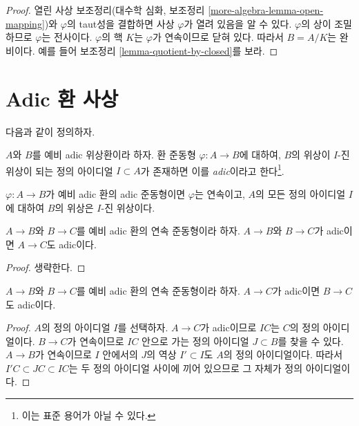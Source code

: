 \begin{proof}
열린 사상 보조정리(대수학 심화, 보조정리
\ref{more-algebra-lemma-open-mapping})와 $\varphi$의 taut성을
결합하면 사상 $\varphi$가 열려 있음을 알 수 있다. $\varphi$의
상이 조밀하므로 $\varphi$는 전사이다. $\varphi$의 핵 $K$는
$\varphi$가 연속이므로 닫혀 있다. 따라서 $B = A/K$는 완비이다. 예를 들어
보조정리 \ref{lemma-quotient-by-closed}를 보라.
\end{proof}







\section{Adic 환 사상}
\label{section-adic-ring-maps}

\noindent
다음과 같이 정의하자.

\begin{definition}
\label{definition-adic-homomorphism}
$A$와 $B$를 예비 adic 위상환이라 하자. 환 준동형
$\varphi : A \to B$에 대하여, $B$의 위상이 $I$-진 위상이 되는
정의 아이디얼 $I \subset A$가 존재하면 이를 {\it adic}이라고
한다\footnote{이는 표준 용어가 아닐 수 있다.}.
\end{definition}

\noindent
$\varphi : A \to B$가 예비 adic 환의 adic 준동형이면
$\varphi$는 연속이고, $A$의 모든 정의 아이디얼 $I$에 대하여
$B$의 위상은 $I$-진 위상이다.

\begin{lemma}
\label{lemma-composition-adic}
$A \to B$와 $B \to C$를 예비 adic 환의 연속 준동형이라 하자.
$A \to B$와 $B \to C$가 adic이면 $A \to C$도 adic이다.
\end{lemma}

\begin{proof}
생략한다.
\end{proof}

\begin{lemma}
\label{lemma-permanence-adic}
$A \to B$와 $B \to C$를 예비 adic 환의 연속 준동형이라 하자.
$A \to C$가 adic이면 $B \to C$도 adic이다.
\end{lemma}

\begin{proof}
$A$의 정의 아이디얼 $I$를 선택하자. $A \to C$가 adic이므로
$IC$는 $C$의 정의 아이디얼이다. $B \to C$가 연속이므로 $IC$ 안으로
가는 정의 아이디얼 $J \subset B$를 찾을 수 있다. $A \to B$가
연속이므로 $I$ 안에서의 $J$의 역상 $I' \subset I$도 $A$의 정의
아이디얼이다. 따라서 $I'C \subset JC \subset IC$는 두 정의
아이디얼 사이에 끼어 있으므로 그 자체가 정의 아이디얼이다.
\end{proof}

